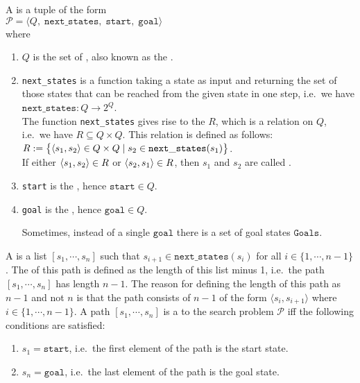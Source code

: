 \begin{Definition}
  A   is a tuple of the form
  \\[0.2cm]
  \hspace*{1.3cm}
  $\mathcal{P} = \langle Q,\;\mathtt{next\_states},\; \mathtt{start},\; \mathtt{goal}\rangle$
  \\[0.2cm]
  where
  \begin{enumerate}
  \item $Q$ is the set of , also known as the .
  \item \texttt{next\_states} is a function taking a state as input and returning the set of those
        states that can be reached from the given state in one step,
        i.e.~we have
        \\[0.2cm]
        \hspace*{1.3cm}
        $\texttt{next\_states}:Q \rightarrow 2^Q$.
        \\[0.2cm]
        The function \texttt{next\_states} gives rise to the  $R$, which is a
        relation on $Q$, i.e.~we have $R \subseteq Q \times Q$.  This relation is defined as follows:
        \\[0.2cm]
        \hspace*{1.3cm}
        $R := \bigl\{ \pair(s_1, s_2) \in Q \times Q \mid s_2 \in \mathtt{next\_states}(s_1) \bigr\}$.
        \\[0.2cm]
        If either $\pair(s_1, s_2) \in R$ or $\pair(s_2, s_1) \in R$, then  $s_1$ and $s_2$ are
        called .
  \item \texttt{start} is the , hence $\mathtt{start} \in Q$.
  \item \texttt{goal} is the , hence $\mathtt{goal} \in Q$.
    
        Sometimes, instead of a single $\texttt{goal}$ there is a set of goal states $\texttt{Goals}$.
  \end{enumerate}
  A   is a list $[s_1, \cdots, s_n]$ such that $s_{i+1} \in \mathtt{next\_states}(s_i)$ for all $i \in
  \{1,\cdots,n-1\}$.
  The  of this path is defined as the length of this list minus 1, i.e.~the path  
  $[s_1, \cdots, s_n]$ has length $n-1$.  The reason for defining the length of this path as $n-1$ and not $n$ 
  is that the path consists of $n-1$   of the form $\langle s_i, s_{i+1} \rangle$ where
  $i \in \{1, \cdots, n-1\}$.
  A path $[s_1, \cdots, s_n]$ is a  
  to the search problem $\mathcal{P}$ iff 
  the following conditions are satisfied:
  \begin{enumerate}
  \item $s_1 = \mathtt{start}$, i.e.~the first element of the path is the start state.
  \item $s_n = \mathtt{goal}$, i.e.~the last element of the path is the goal state.


\end{enumerate}
\end{Definition}
